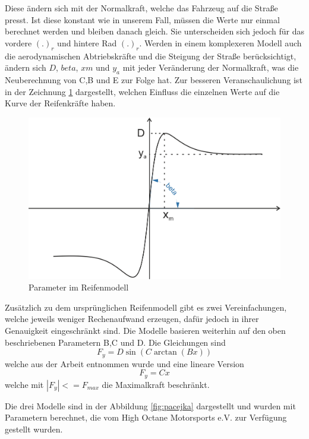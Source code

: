 \documentclass{like}
\begin{document}
Diese ändern sich mit der Normalkraft, welche das Fahrzeug auf die Straße presst. Ist diese konstant wie in unserem Fall, müssen die Werte nur einmal berechnet werden und bleiben danach gleich. Sie unterscheiden sich jedoch für das vordere $(.)_r$ und hintere Rad $(.)_r$. Werden in einem komplexeren Modell auch die aerodynamischen Abtriebskräfte und die Steigung der Straße berücksichtigt, ändern sich $D$, $beta$, $xm$ und $y_a$ mit jeder Veränderung der Normalkraft, was die Neuberechnung von C,B und E zur Folge hat. Zur besseren Veranschaulichung ist in der Zeichnung \ref{fig:tireModelParameter} dargestellt, welchen Einfluss die einzelnen Werte auf die Kurve der Reifenkräfte haben. 

\begin{figure}[ht!]
	\centering
	\includegraphics[width=350pt]{Abbildungen/tireModel.png}
	\caption{Parameter im Reifenmodell}
	\label{fig:tireModelParameter}
\end{figure}
 
Zusätzlich zu dem ursprünglichen Reifenmodell gibt es zwei Vereinfachungen, welche jeweils weniger Rechenaufwand erzeugen, dafür jedoch in ihrer Genauigkeit eingeschränkt sind. Die Modelle basieren weiterhin auf den oben beschriebenen Parametern B,C und D. Die Gleichungen sind 
\begin{equation}
	F_y = D\sin(C\arctan(Bx))
\end{equation} 
welche aus der Arbeit \cite{rc_car_1_43} entnommen wurde und eine lineare Version 
\begin{equation}
	F_y = C x 
\end{equation} 
welche mit $|F_y| <= F_{max} $ die Maximalkraft beschränkt. 

Die drei Modelle sind in der Abbildung \ref{fig:pacejka} dargestellt und wurden mit Parametern berechnet, die vom  High Octane Motorsports e.V. zur Verfügung gestellt wurden.
\end{document}
